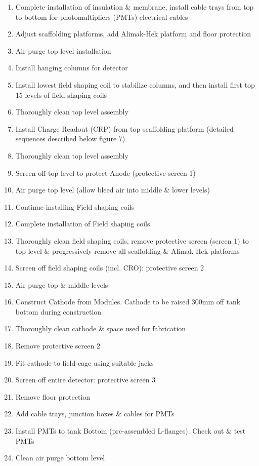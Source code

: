 \begin{enumerate}
\item{Complete installation of insulation \& membrane, install cable trays from top to bottom for photomultipliers (PMTs) electrical cables}
\item{Adjust scaffolding platforms, add Alimak-Hek platform and floor protection}
\item{Air purge top level installation}
\item{Install hanging columns for detector}
\item{Install lowest field shaping coil to stabilize columns, and then install first top 15 levels of field shaping coils}
\item{Thoroughly clean top level assembly}
\item{Install Charge Readout (CRP) from top scaffolding platform (detailed sequences described below figure 7)}
\item{Thoroughly clean top level assembly}
\item{Screen off top level to protect Anode (protective screen 1)}
\item{Air purge top level (allow bleed air into middle \& lower levels)}
\item{Continue installing Field shaping coils}
\item{Complete installation of Field shaping coils}
\item{Thoroughly clean field shaping coils, remove protective screen (screen 1) to top level \& progressively remove all scaffolding \& Alimak-Hek platforms}
\item{Screen off field shaping coils (incl. CRO): protective screen 2}
\item{Air purge top \& middle levels}
\item{Construct Cathode from Modules. Cathode to be raised 300mm off tank bottom during construction}
\item{Thoroughly clean cathode \& space used for fabrication}
\item{Remove protective screen 2}
\item{Fit cathode to field cage using suitable jacks}
\item{Screen off entire detector: protective screen 3}
\item{Remove floor protection}
\item{Add cable trays, junction boxes \& cables for PMTs}
\item{Install PMTs to tank Bottom (pre-assembled L-flanges). Check out \& test PMTs}
\item{Clean air purge bottom level}

\end{enumerate}
